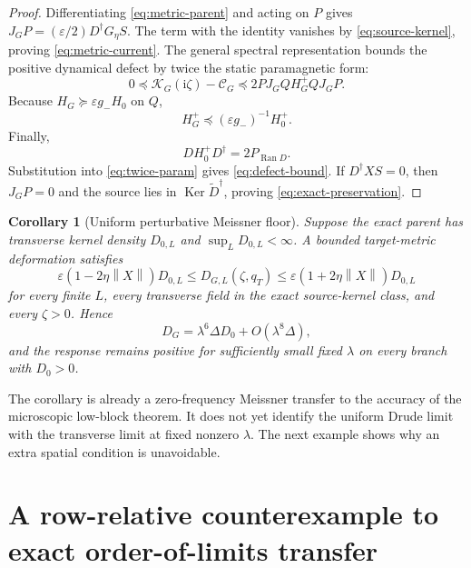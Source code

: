 \documentclass[11pt]{article}
\newtheorem{corollary}[theorem]{Corollary}
\theoremstyle{definition}
\theoremstyle{remark}
\newcommand{\cK}{\mathcal K}
\newcommand{\cC}{\mathcal C}
\newcommand{\Ker}{\operatorname{Ker}}
\newcommand{\Ran}{\operatorname{Ran}}
\newcommand{\I}{\mathrm i}
\newcommand{\norm}[1]{\left\lVert #1\right\rVert}
\newcommand{\eps}{\varepsilon}
\begin{document}
\begin{proof}
Differentiating \eqref{eq:metric-parent} and acting on $P$ gives
$J_GP=(\eps/2)D^\dagger G_\eta S$.  The term with the identity vanishes by
\eqref{eq:source-kernel}, proving \eqref{eq:metric-current}.  The general
spectral representation bounds the positive dynamical defect by twice the
static paramagnetic form:
\begin{equation}
 0\preceq\cK_G(\I\zeta)-\cC_G
 \preceq2PJ_GQH_G^+QJ_GP.
 \label{eq:twice-param}
\end{equation}
Because $H_G\succeq\eps g_-H_0$ on $Q$,
\begin{equation}
 H_G^+\preceq(\eps g_-)^{-1}H_0^+.
\end{equation}
Finally,
\begin{equation}
 DH_0^+D^\dagger=2P_{\Ran D}.
 \label{eq:partial-isometry}
\end{equation}
Substitution into \eqref{eq:twice-param} gives
\eqref{eq:defect-bound}.  If $D^\dagger XS=0$, then $J_GP=0$ and the source
lies in $\Ker\widetilde D^\dagger$, proving \eqref{eq:exact-preservation}.
\end{proof}

\begin{corollary}[Uniform perturbative Meissner floor]
\label{cor:floor}
Suppose the exact parent has transverse kernel density $D_{0,L}$ and
$\sup_LD_{0,L}<\infty$.  A bounded target-metric deformation satisfies
\begin{equation}
 \eps(1-2\eta\norm X)D_{0,L}
 \le D_{G,L}(\zeta,q_T)
 \le\eps(1+2\eta\norm X)D_{0,L}
 \label{eq:floor-bound}
\end{equation}
for every finite $L$, every transverse field in the exact source-kernel class,
and every $\zeta>0$.  Hence
\begin{equation}
 D_{G}=\lambda^6\Delta D_0+O(\lambda^8\Delta),
 \label{eq:transfer-order8}
\end{equation}
and the response remains positive for sufficiently small fixed $\lambda$ on
every branch with $D_0>0$.
\end{corollary}

The corollary is already a zero-frequency Meissner transfer to the accuracy of
the microscopic low-block theorem.  It does not yet identify the uniform
Drude limit with the transverse limit at fixed nonzero $\lambda$.  The next
example shows why an extra spatial condition is unavoidable.

\section{A row-relative counterexample to exact order-of-limits transfer}
\label{sec:anisotropic-counterexample}
\end{document}
